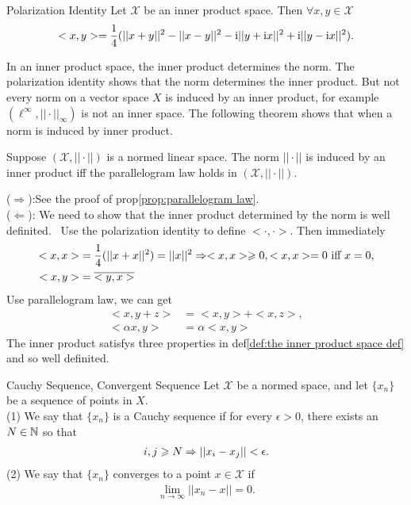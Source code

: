 \begin{proposition}{Polarization Identity}{}
    Let $\mathscr{X}$ be an inner product space. Then $\forall x,y\in\mathscr{X}$
    \begin{align*}
        <x,y> = \frac{1}{4}(||x+y||^2-||x-y||^2- \mathrm{i} ||y+\mathrm{i} x||^2+\mathrm{i} ||y-\mathrm{i} x||^2).
    \end{align*}
\end{proposition}

\begin{remark}
    In an inner product space, the inner product determines the norm. The polarization identity shows
    that the norm determines the inner product. But not every norm on a vector space $X$ is induced by an inner product, 
    for example $(\ell^{\infty},||\cdot||_{\infty})$ is not an inner space. The following theorem shows that when a norm is induced by inner product.
\end{remark}

\begin{theorem}{}{}
    Suppose $(\mathscr{X},||\cdot||)$ is a normed linear space. The norm $||\cdot||$ is induced by an inner product 
    iff the parallelogram law holds in $(\mathscr{X},||\cdot||)$.
\end{theorem}
\begin{proofsolution}
    ($\Rightarrow$):See the proof of prop\ref{prop:parallelogram law}.\\
    ($\Leftarrow$): We need to show that the inner product determined by the norm is well definited. \
    Use the polarization identity to define $<\cdot,\cdot>$. Then immediately 
    \begin{align*}
        <x,x> &= \frac{1}{4}(||x+x||^2)=||x||^2 \Rightarrow <x,x>\geqslant 0, <x,x>=0 \text{ iff } x=0,\\
        <x,y> &= \overline{<y,x>}
    \end{align*}
    Use parallelogram law, we can get
    \begin{align*}
        <x,y+z> &= <x,y>+<x,z>,\\
        <\alpha x,y>&=\alpha<x,y>
    \end{align*}
    The inner product satisfys three properties in def\ref{def:the inner product space def} and so well definited.
\end{proofsolution}

\begin{definition}{Cauchy Sequence, Convergent Sequence}{}
    Let $\mathscr{X}$ be a normed space, and let $\{x_n\}$ be a sequence of points in $X$. \\
    (1) We say that $\{x_n\}$ is a Cauchy sequence if for every $\epsilon>0$, there exists an $N\in \mathbb{N}$ so that
    \begin{align*}
        i,j\geqslant N\Rightarrow ||x_i-x_j||<\epsilon.
    \end{align*}
    (2) We say that $\{x_n\}$ converges to a point $x\in \mathscr{X}$ if
    \begin{align*}
        \lim_{n\rightarrow \infty} ||x_n-x||=0.
    \end{align*}
\end{definition}

